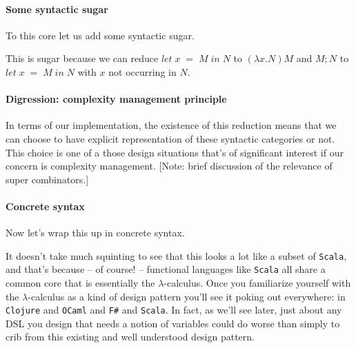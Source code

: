 \paragraph{Some syntactic sugar}
To this core let us add some syntactic sugar.


This is sugar because we can reduce $let \; x \; = \; M \; in \; N$ to
$(\lambda x. N) M$ and $ M; N$ to $let \; x \; = \; M \; in \; N$ with
$x$ not occurring in $N$.

\paragraph{Digression: complexity management principle} In terms of
our implementation, the existence of this reduction means that we can
choose to have explicit representation of these syntactic categories
or not. This choice is one of a those design situations that's of
significant interest if our concern is complexity management. [Note:
brief discussion of the relevance of super combinators.]

\paragraph{Concrete syntax}
Now let's wrap this up in concrete syntax.


It doesn't take much squinting to see that this looks a lot like a
subset of \texttt{Scala}, and that's because -- of course! --
functional languages like \texttt{Scala} all share a common core that
is essentially the $\lambda$-calculus. Once you familiarize yourself
with the $\lambda$-calculus as a kind of design pattern you'll see it
poking out everywhere: in \texttt{Clojure} and \texttt{OCaml} and
\texttt{F\#} and \texttt{Scala}. In fact, as we'll see later, just
about any DSL you design that needs a notion of variables could do
worse than simply to crib from this existing and well understood
design pattern.

